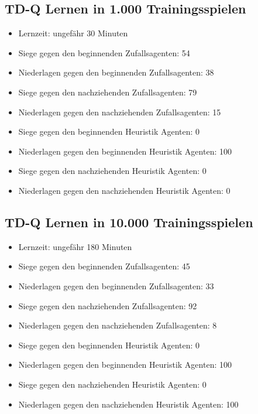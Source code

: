 \subsection{TD-Q Lernen in 1.000 Trainingsspielen}
\begin{itemize}
\item Lernzeit: ungefähr 30 Minuten

\item Siege gegen den beginnenden Zufallsagenten: 54
\item Niederlagen gegen den beginnenden Zufallsagenten: 38

\item Siege gegen den nachziehenden Zufallsagenten: 79
\item Niederlagen gegen den nachziehenden Zufallsagenten: 15

\item Siege gegen den beginnenden Heuristik Agenten: 0
\item Niederlagen gegen den beginnenden Heuristik Agenten: 100

\item Siege gegen den nachziehenden Heuristik Agenten: 0
\item Niederlagen gegen den nachziehenden Heuristik Agenten: 0

\end{itemize}


\subsection{TD-Q Lernen in 10.000 Trainingsspielen}
\begin{itemize}
\item Lernzeit: ungefähr 180 Minuten

\item Siege gegen den beginnenden Zufallsagenten: 45
\item Niederlagen gegen den beginnenden Zufallsagenten: 33

\item Siege gegen den nachziehenden Zufallsagenten: 92
\item Niederlagen gegen den nachziehenden Zufallsagenten: 8

\item Siege gegen den beginnenden Heuristik Agenten: 0
\item Niederlagen gegen den beginnenden Heuristik Agenten: 100 

\item Siege gegen den nachziehenden Heuristik Agenten: 0
\item Niederlagen gegen den nachziehenden Heuristik Agenten: 100 
\end{itemize}


